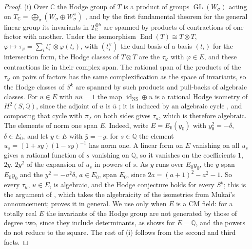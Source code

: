 \documentclass[11pt,reqno]{amsart}
\theoremstyle{plain}
\theoremstyle{definition}
\theoremstyle{remark}
\newcommand{\QQ}{\mathbb{Q}}
\newcommand{\CC}{\mathbb{C}}
\newcommand{\NS}{\mathrm{NS}}
\DeclareMathOperator{\End}{End}
\DeclareMathOperator{\id}{id}
\DeclareMathOperator{\GL}{GL}
\begin{document}
\begin{proof}
(i) Over $\CC$ the Hodge group of $T$ is a product of groups
$\GL(W_{\sigma})$ acting on
$T_{\CC}=\bigoplus_{\sigma}(W_{\sigma}\oplus W_{\sigma}^{\vee})$
\cite{Zar83}, and by the first fundamental theorem for the general linear
group \cite[Chapter~5]{GW09} its invariants in $T_{\CC}^{\otimes b}$ are
spanned by products of contractions of one factor with another. Under the
isomorphism $\End(T)\cong T\otimes T$, $\varphi\mapsto\tau_{\varphi}=
\sum_{i}t_{i}^{\vee}\otimes\varphi(t_{i})$, with $(t_{i}^{\vee})$ the dual
basis of a basis $(t_{i})$ for the intersection form, the Hodge classes of
$T\otimes T$ are the $\tau_{\varphi}$ with $\varphi\in E$, and these
contractions lie in their complex span. The rational span of the products of
the $\tau_{\varphi}$ on pairs of factors has the same complexification as the
space of invariants, so the Hodge classes of $S^{k}$ are spanned by such
products and pull-backs of algebraic classes. For $u\in E$ with $u\bar u=1$
the map $\id_{\NS}\oplus u$ is a rational Hodge isometry of
$H^{2}(S,\QQ)$, since the adjoint of $u$ is $\bar u$ \cite{Zar83}; it is
induced by an algebraic cycle \cite{Bus19}, and composing that cycle with
$\pi_{T}$ on both sides gives $\tau_{u}$, which is therefore algebraic. The
elements of norm one span $E$. Indeed, write $E=E_{0}(y_{0})$ with
$y_{0}^{2}=-\delta$, $\delta\in E_{0}$, and let $y\in E$ with $\bar y=-y$; for
$s\in\QQ$ the element $u_{s}=(1+sy)(1-sy)^{-1}$ has norm one. A linear form
on $E$ vanishing on all $u_{s}$ gives a rational function of $s$ vanishing on
$\QQ$, so it vanishes on the coefficients $1$, $2y$, $2y^{2}$ of the expansion
of $u_{s}$ in powers of $s$. As $y$ runs over $E_{0}y_{0}$, the $y$ span
$E_{0}y_{0}$ and the $y^{2}=-a^{2}\delta$, $a\in E_{0}$, span $E_{0}$, since
$2a=(a+1)^{2}-a^{2}-1$. So every $\tau_{u}$, $u\in E$, is algebraic, and the
Hodge conjecture holds for every $S^{k}$; this is the argument of
\cite[Lemma~5.3, Theorem~5.4]{RM08}, which takes the algebraicity of the
isometries from Mukai's announcement; \cite{Bus19} proves it in general.
We use \cite{RM08} only when $E$ is a CM field: for a totally real $E$ the
invariants of the Hodge group are not generated by those of degree two, since
they include determinants, as  shows for $E=\QQ$, and
the powers do not reduce to the square. The rest of (i) follows
from the second and third facts.


\end{proof}
\end{document}
